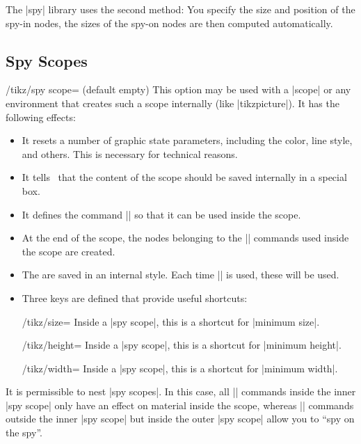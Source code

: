The |spy| library uses the second method: You specify the size and position of
the spy-in nodes, the sizes of the spy-on nodes are then computed
automatically.


\subsection{Spy Scopes}

\begin{key}{/tikz/spy scope= (default \normalfont empty)}
    This option may be used with a |{scope}| or any environment that creates
    such a scope internally (like |{tikzpicture}|). It has the following
    effects:
    \begin{itemize}
        \item It resets a number of graphic state parameters, including the
            color, line style, and others. This is necessary for technical
            reasons.
        \item It tells \tikzname\ that the content of the scope should be saved
            internally in a special box.
        \item It defines the command |\spy| so that it can be used inside the
            scope.
        \item At the end of the scope, the nodes belonging to the |\spy|
            commands used inside the scope are created.
        \item The  are saved in an internal style. Each time
            |\spy| is used, these  will be used.
        \item Three keys are defined that provide useful shortcuts:
            \begin{key}{/tikz/size=}
                Inside a |spy scope|, this is a shortcut for |minimum size|.
            \end{key}
            \begin{key}{/tikz/height=}
                Inside a |spy scope|, this is a shortcut for |minimum height|.
            \end{key}
            \begin{key}{/tikz/width=}
                Inside a |spy scope|, this is a shortcut for |minimum width|.
            \end{key}
    \end{itemize}
    It is permissible to nest |spy scopes|. In this case, all |\spy| commands
    inside the inner |spy scope| only have an effect on material inside the
    scope, whereas |\spy| commands outside the inner |spy scope| but inside the
    outer |spy scope| allow you to ``spy on the spy''.
\begin{codeexample}[]
\begin{tikzpicture}
  [spy using outlines={rectangle, red, magnification=5,
                       size=1.5cm, connect spies}]


\end{tikzpicture}
\end{codeexample}
\end{key}
